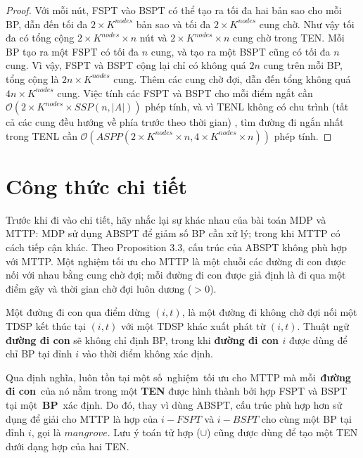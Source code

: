\documentclass[../main.tex]{subfiles}
\begin{document}
\begin{proof} 
Với mỗi nút, FSPT vào BSPT có thể tạo ra tối đa hai bản sao cho mỗi BP, dẫn
đến tối đa \(2\times K^{nodes}\) bản sao và tối đa \(2\times K^{nodes}\)
cung chờ. Như vậy tối đa có tổng cộng \(2\times K^{nodes}\times n\) nút
và \(2\times K^{nodes}\times n\) cung chờ trong TEN. Mỗi BP tạo ra một
FSPT có tối đa \(n\) cung, và tạo ra một BSPT cũng có tối đa \(n\) cung.
Vì vậy, FSPT và BSPT cộng lại chỉ có không quá \(2n\) cung trên mỗi BP,
tổng cộng là \(2n\times K^{nodes}\) cung. Thêm các cung chờ đợi, dẫn đến
tổng không quá \(4n\times K^{nodes}\) cung. Việc tính các FSPT và BSPT
cho mỗi điểm ngắt cần
\(\mathcal{O}(2\times K^{nodes}\times SSP(n, |A|))\) phép tính, và vì
TENL không có chu trình (tất cả các cung đều hướng về phía trước theo
thời gian) , tìm đường đi ngắn nhất trong TENL cần
\(\mathcal{O}(ASPP(2\times K^{nodes}\times n, 4\times K^{nodes}\times n))\)
phép tính.
\end{proof}

\section{Công thức chi tiết}\label{cong-thuc2}

Trước khi đi vào chi tiết, hãy nhắc lại sự khác nhau của bài toán MDP và
MTTP: MDP sử dụng ABSPT để giảm số BP cần xử lý; trong khi MTTP
có cách tiếp cận khác. Theo Proposition 3.3, cấu trúc của ABSPT không
phù hợp với MTTP. Một nghiệm tối ưu cho MTTP là một chuỗi các đường đi
con được nối với nhau bằng cung chờ đợi; mỗi đường đi con được giả định
là đi qua một điểm gãy và thời gian chờ đợi luôn dương (\(>0\)).

\begin{definition}
\label{def:duong-di-con}
Một đường đi con qua điểm
dừng \((i, t)\), là một đường đi không chờ đợi nối một TDSP kết thúc tại
\((i, t)\) với một TDSP khác xuất phát từ \((i, t)\). Thuật ngữ
\textbf{đường đi con} sẽ không chỉ định BP, trong khi
\textbf{đường đi con \(i\)} được dùng để chỉ BP tại đỉnh \(i\)
vào thời điểm không xác định.
\end{definition}

Qua định nghĩa, luôn tồn tại một số~nghiệm~tối ưu cho MTTP mà
mỗi~\textbf{đường đi con}~của nó nằm trong một \textbf{TEN} được hình
thành bởi hợp FSPT và BSPT tại một~\textbf{BP}~xác định. Do đó,
thay vì dùng ABSPT, cấu trúc phù hợp hơn sử dụng để giải cho MTTP là hợp
của \(i-FSPT\) và \(i-BSPT\) cho cùng một BP tại đỉnh \(i\), gọi
là \(mangrove\). Lưu ý toán tử hợp (\(\cup\)) cũng được dùng để tạo một
TEN dưới dạng hợp của hai TEN.
\end{document}
